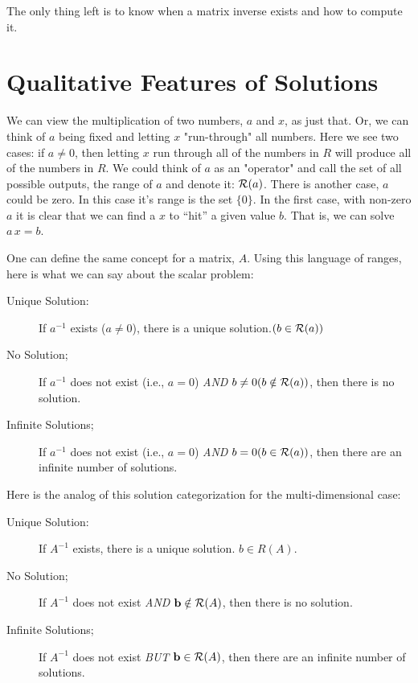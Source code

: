 \documentclass{article}
\begin{document}
The only thing left is to know when a matrix inverse exists and how to compute it.


\section{Qualitative Features of Solutions}
We can view the multiplication of two numbers, $a$ and $x$, as just that.
Or, we can think of $a$ being fixed and letting $x$ "run-through" all 
numbers. Here we see two cases: if $a \neq 0$, then letting $x$ run
through all of the numbers in $R$ will produce all of the numbers in $R$.
We could think of $a$ as an "operator" and call the set of all possible 
outputs, the range of $a$ and denote it: ${\cal R}(a)$.
There is another case, $a$ could be zero. In this case it's range is the
set $\{0\}$. In the first case, with non-zero $a$ it is clear that we can
find a $x$ to ``hit'' a given value $b$. That is, we can solve $a\, x = b$.

One can define the same concept for a matrix, $A$. Using this language
of ranges, here is what we can say about the scalar problem:
\begin{description}
    \item[Unique Solution:]{If $a^{-1}$ exists ($a \neq 0$), there is
    a unique solution.$(b \in {\cal R}(a))$}
\item[No Solution;]{If $a^{-1}$ does not exist (i.e., $a = 0$) {\em AND\/}
    $b \ne 0(b \notin {\cal R}(a))$, then there is no solution.}
\item[Infinite Solutions;]{If $a^{-1}$ does not exist (i.e., $a = 0$) {\em AND\/}
    $b = 0(b \in {\cal R}(a))$, then there are an infinite number of solutions.}
\end{description}

Here is the analog of this solution categorization for the multi-dimensional case:
\begin{description}
\item[Unique Solution:]{If $A^{-1}$ exists, there is
    a unique solution. $b \in R(A)$.}
\item[No Solution;]{If $A^{-1}$ does not exist {\em AND\/}
    ${\bf b} \notin {\cal R}(A)$,
    then there is no solution.}  
\item[Infinite Solutions;]{If $A^{-1}$ does not exist {\em BUT\/}
    ${\bf b} \in {\cal R}(A)$,
    then there are an infinite number of solutions.}  
\end{description}
\end{document}
